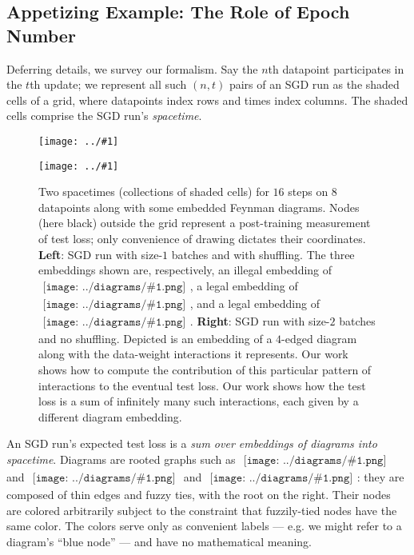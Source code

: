 \documentclass{article}
\newcommand{\plotmooh}[3]{
    \texttt{[image: ../\#1]}
}
\newcommand{\sdia}[1]{\begin{gathered}\texttt{[image: ../diagrams/\#1.png]}\end{gathered}}
\begin{document}
    \subsection{Appetizing Example: The Role of Epoch Number}

        Deferring details, we survey our formalism. 
        Say the $n$th datapoint participates in the $t$th update; we represent
        all such $(n, t)$ pairs of an SGD run as the shaded cells of a grid,
        where datapoints index rows and times index columns.  The shaded cells
        comprise the SGD run's \emph{spacetime}.
        \begin{figure}[H] 
            \centering  
            \plotmooh{diagrams/spacetime-e}{}{0.26\columnwidth}
            \plotmooh{diagrams/spacetime-f}{}{0.26\columnwidth}
            \caption{
                Two spacetimes (collections of shaded cells) for $16$ steps on
                $8$ datapoints along with some embedded Feynman diagrams.
                Nodes (here black) outside the grid represent a post-training
                measurement of test loss; only convenience of drawing dictates
                their coordinates.
                {\bf Left}: SGD run with size-$1$ batches and with shuffling.
                    The three embeddings shown are, respectively,
                    an illegal embedding of $\sdia{(01-2)(01-12)}$,
                    a legal embedding of $\sdia{(01-2)(01-12)}$, and 
                    a legal embedding of $\sdia{(0-1-2)(01-12)}$.
                {\bf Right}: SGD run with size-$2$ batches and no shuffling.
                    Depicted is an embedding of a $4$-edged diagram along
                    with the data-weight interactions it represents.  Our work
                    shows how to compute the contribution of this particular
                    pattern of interactions to the eventual test loss.  Our
                    work shows how the test loss is a sum of infinitely many
                    such interactions, each given by a different diagram
                    embedding. 
            }
            \label{fig:spacetimes}
        \end{figure}

        An SGD run's expected test loss is a \emph{sum over embeddings of
        diagrams into spacetime}.  Diagrams are rooted graphs such as
        $\sdia{(0-1)(01)}$ and $\sdia{(01-2)(02-12)}$ and
        $\sdia{(01-2)(01-12)}$: they are composed of thin edges and fuzzy ties,
        with the root on the right.  Their nodes are colored arbitrarily
        subject to the constraint that fuzzily-tied nodes have the same color.
        The colors serve only as convenient labels --- e.g. we might refer to a
        diagram's ``blue node'' --- and have no mathematical meaning.
\end{document}
